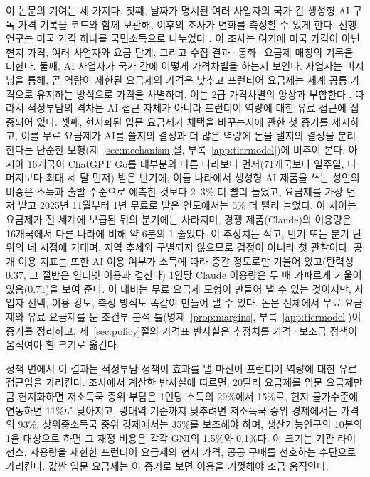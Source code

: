 \documentclass[11pt]{article}
\theoremstyle{definition}
\theoremstyle{remark}
\begin{document}
이 논문의 기여는 세 가지다. 첫째, 날짜가 명시된 여러 사업자의 국가 간 생성형 AI 구독 가격 기록을 코드와 함께 보관해, 이후의 조사가 변화를 측정할 수 있게 한다. 선행 연구는 미국 가격 하나를 국민소득으로 나누었다 \citep{sathish2024llempower}. 이 조사는 여기에 미국 가격이 아닌 현지 가격, 여러 사업자와 요금 단계, 그리고 수집 결과·통화·요금제 매칭의 기록을 더한다. 둘째, AI 사업자가 국가 간에 어떻게 가격차별을 하는지 보인다. 사업자는 버저닝을 통해, 곧 역량이 제한된 요금제의 가격은 낮추고 프런티어 요금제는 세계 공통 가격으로 유지하는 방식으로 가격을 차별하며, 이는 2급 가격차별의 양상과 부합한다 \citep{mussa1978monopoly,goldfarb2019digital}. 따라서 적정부담의 격차는 AI 접근 자체가 아니라 프런티어 역량에 대한 유료 접근에 집중되어 있다. 셋째, 현지화된 입문 요금제가 채택을 바꾸는지에 관한 첫 증거를 제시하고, 이를 무료 요금제가 AI를 쓸지의 결정과 더 많은 역량에 돈을 낼지의 결정을 분리한다는 단순한 모형(제~\ref{sec:mechanism}절, 부록~\ref{app:tiermodel})에 비추어 본다. 아시아 16개국이 ChatGPT Go를 대부분의 다른 나라보다 먼저(71개국보다 일주일, 나머지보다 최대 세 달 먼저) 받은 반기에, 이들 나라에서 생성형 AI 제품을 쓰는 성인의 비중은 소득과 출발 수준으로 예측한 것보다 2--3\% 더 빨리 늘었고, 요금제를 가장 먼저 받고 2025년 11월부터 1년 무료로 받은 인도에서는 5\% 더 빨리 늘었다. 이 차이는 요금제가 전 세계에 보급된 뒤의 분기에는 사라지며, 경쟁 제품(Claude)의 이용량은 16개국에서 다른 나라에 비해 약 6분의 1 줄었다. 이 추정치는 작고, 반기 또는 분기 단위의 네 시점에 기대며, 지역 추세와 구별되지 않으므로 검정이 아니라 첫 관찰이다. 공개 이용 지표는 또한 AI 이용 여부가 소득에 따라 중간 정도로만 기울어 있고(탄력성 0.37, 그 절반은 인터넷 이용과 겹친다) 1인당 Claude 이용량은 두 배 가파르게 기울어 있음(0.71)을 보여 준다. 이 대비는 무료 요금제 모형이 만들어 낼 수 있는 것이지만, 사업자 선택, 이용 강도, 측정 방식도 똑같이 만들어 낼 수 있다. 논문 전체에서 무료 요금제와 유료 요금제를 둔 조건부 분석 틀(명제~\ref{prop:margins}, 부록~\ref{app:tiermodel})이 증거를 정리하고, 제~\ref{sec:policy}절의 가격표 반사실은 추정치를 가격·보조금 정책이 움직여야 할 크기로 옮긴다.

정책 면에서 이 결과는 적정부담 정책이 효과를 낼 마진이 프런티어 역량에 대한 유료 접근임을 가리킨다. 조사에서 계산한 반사실에 따르면, 20달러 요금제를 입문 요금제만큼 현지화하면 저소득국 중위 부담은 1인당 소득의 29\%에서 15\%로, 현지 물가수준에 연동하면 11\%로 낮아지고, 광대역 기준까지 낮추려면 저소득국 중위 경제에서는 가격의 93\%, 상위중소득국 중위 경제에서는 35\%를 보조해야 하며, 생산가능인구의 10분의 1을 대상으로 하면 그 재정 비용은 각각 GNI의 1.5\%와 0.1\%다. 이 크기는 기관 라이선스, 사용량을 제한한 프런티어 요금제의 현지 가격, 공공 구매를 선호하는 수단으로 가리킨다. 값싼 입문 요금제는 이 증거로 보면 이용을 기껏해야 조금 움직인다.
\end{document}
